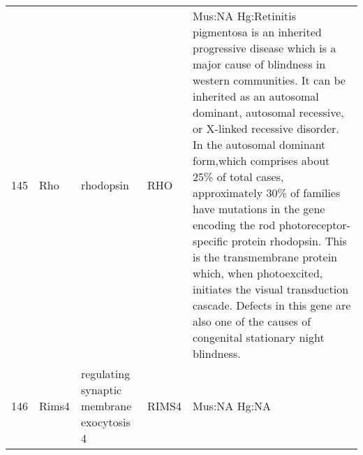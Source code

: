 \documentclass[11pt, landscape]{article}   	%
\begin{document}
\begin{table}[ht]
\begin{tabular}{rlp{3cm}lp{12cm}}
  145 & Rho & rhodopsin & RHO & Mus:NA Hg:Retinitis pigmentosa is an inherited progressive disease which is a major cause of blindness in western communities. It can be inherited as an autosomal dominant, autosomal recessive, or X-linked recessive disorder. In the autosomal dominant form,which comprises about 25\% of total cases, approximately 30\% of families have mutations in the gene encoding the rod photoreceptor-specific protein rhodopsin. This is the transmembrane protein which, when photoexcited, initiates the visual transduction cascade. Defects in this gene are also one of the causes of congenital stationary night blindness. \\ 
  146 & Rims4 & regulating synaptic membrane exocytosis 4 & RIMS4 & Mus:NA Hg:NA \\ 

   \hline
\end{tabular}
\end{table}
\end{document}
